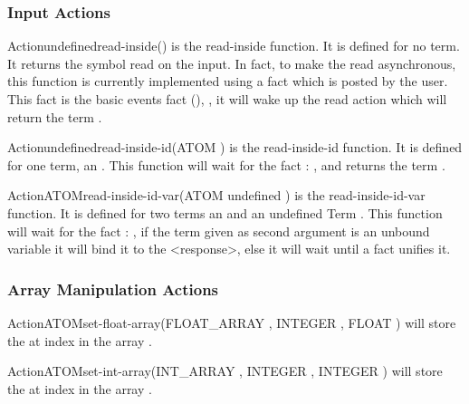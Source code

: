 \subsubsection{Input Actions}

\begin{typeefa}{Action}{undefined}{read-inside}{()}
is the read-inside function. It is defined for no term. It returns the
symbol read on the input. In fact, to make the read asynchronous, this
function is currently implemented using a fact which is posted by the
user.  This fact is the basic events fact (),
, it will wake up the read action which
will return the term .
\end{typeefa}

\begin{typeefa}{Action}{undefined}{read-inside-id}{(ATOM )}
is the read-inside-id function. It is defined for one term, an . This
function will wait for the fact : , and
returns the term .
\end{typeefa}

\begin{typeefa}{Action}{ATOM}{read-inside-id-var}{(ATOM  undefined )}
is the read-inside-id-var function. It is defined for two
terms an   and an undefined Term .  This
function will wait for the fact : , if
the term  given as second argument is an unbound variable it
will bind it to the <response>, else it will wait until a fact unifies it.
\end{typeefa}

\subsubsection{Array Manipulation Actions}

\begin{typeefa}{Action}{ATOM}{set-float-array}{(FLOAT\_ARRAY ,
INTEGER , FLOAT )}
will store the   at index  in the array
.
\end{typeefa}

\begin{typeefa}{Action}{ATOM}{set-int-array}{(INT\_ARRAY ,
INTEGER , INTEGER )}
will store the   at index  in the array
.
\end{typeefa}

